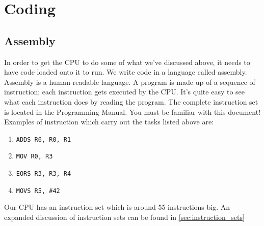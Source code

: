 \chapter{Coding}

\section{Assembly}

In order to get the CPU to do some of what we've discussed above, it needs to have code loaded onto it to run. We write code in a language called assembly. Assembly is a human-readable language. A program is made up of a sequence of instruction; each instruction gets executed by the CPU. It's quite easy to see what each instruction does by reading the program.  The complete instruction set is located in the Programming Manual. You must be familiar with this document! Examples of instruction which carry out the tasks listed above are:
\begin{enumerate}
  \item \texttt{ADDS R6, R0, R1}
  \item \texttt{MOV R0, R3}
  \item \texttt{EORS R3, R3, R4}
  \item \texttt{MOVS R5, \#42}
\end{enumerate}

Our CPU has an instruction set which is around 55 instructions big. An expanded discussion of instruction sets can be found in \autoref{sec:instruction_sets}

